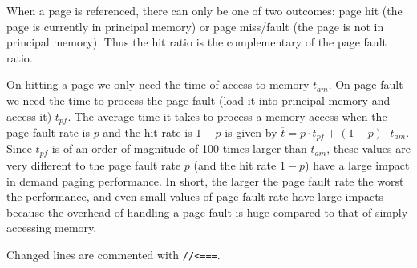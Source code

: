\documentclass{sope}
\begin{document}
When a page is referenced, there can only be one of two outcomes: page hit (the page is currently in principal memory) or page miss/fault (the page is not in principal memory). Thus the hit ratio is the complementary of the page fault ratio.

On hitting a page we only need the time of access to memory $t_{am}$. On page fault we need the time to process the page fault (load it into principal memory and access it) $t_{pf}$. The average time it takes to process a memory access when the page fault rate is $p$ and the hit rate is $1-p$ is given by $\overline{t} = p \cdot t_{pf} + (1-p) \cdot t_{am}$. Since $t_{pf}$ is of an order of magnitude of 100 times larger than $t_{am}$, these values are very different to the page fault rate $p$ (and the hit rate $1-p$) have a large impact in demand paging performance. In short, the larger the page fault rate the worst the performance, and even small values of page fault rate have large impacts because the overhead of handling a page fault is huge compared to that of simply accessing memory.



Changed lines are commented with \texttt{//<===}.

\end{document}
